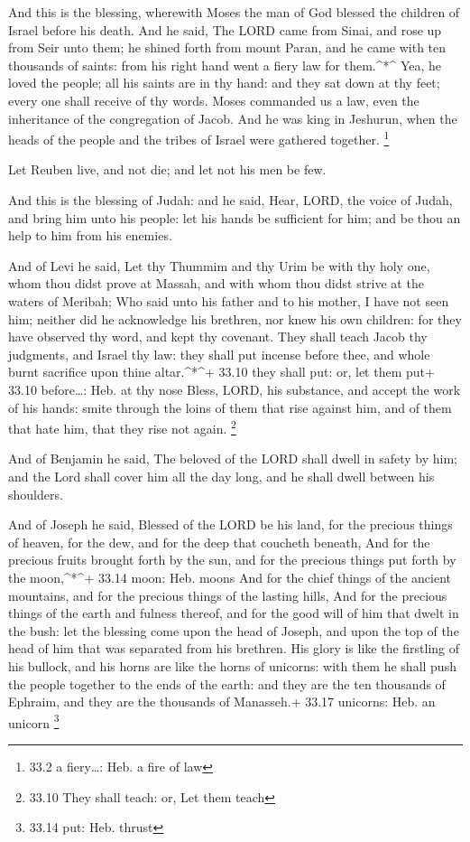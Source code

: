  And this is the blessing, wherewith Moses the man of God
blessed the children of Israel before his death.  And he
said, The LORD came from Sinai, and rose up from Seir unto them; he
shined forth from mount Paran, and he came with ten thousands of saints:
from his right hand went a fiery law for them.\^{}*\^{} 
Yea, he loved the people; all his saints are in thy hand: and they sat
down at thy feet; every one shall receive of thy words. 
Moses commanded us a law, even the inheritance of the congregation of
Jacob.  And he was king in Jeshurun, when the heads of the
people and the tribes of Israel were gathered together. \footnote{33.2 a
  fiery\ldots: Heb. a fire of law}

 Let Reuben live, and not die; and let not his men be few.

 And this is the blessing of Judah: and he said, Hear, LORD,
the voice of Judah, and bring him unto his people: let his hands be
sufficient for him; and be thou an help to him from his enemies.

 And of Levi he said, Let thy Thummim and thy Urim be with
thy holy one, whom thou didst prove at Massah, and with whom thou didst
strive at the waters of Meribah;  Who said unto his father
and to his mother, I have not seen him; neither did he acknowledge his
brethren, nor knew his own children: for they have observed thy word,
and kept thy covenant.  They shall teach Jacob thy
judgments, and Israel thy law: they shall put incense before thee, and
whole burnt sacrifice upon thine altar.\^{}*\^{}+ 33.10 they shall put:
or, let them put+ 33.10 before\ldots: Heb. at thy nose 
Bless, LORD, his substance, and accept the work of his hands: smite
through the loins of them that rise against him, and of them that hate
him, that they rise not again. \footnote{33.10 They shall teach: or, Let
  them teach}

 And of Benjamin he said, The beloved of the LORD shall
dwell in safety by him; and the Lord shall cover him all the day long,
and he shall dwell between his shoulders.

 And of Joseph he said, Blessed of the LORD be his land,
for the precious things of heaven, for the dew, and for the deep that
coucheth beneath,  And for the precious fruits brought
forth by the sun, and for the precious things put forth by the
moon,\^{}*\^{}+ 33.14 moon: Heb. moons  And for the chief
things of the ancient mountains, and for the precious things of the
lasting hills,  And for the precious things of the earth
and fulness thereof, and for the good will of him that dwelt in the
bush: let the blessing come upon the head of Joseph, and upon the top of
the head of him that was separated from his brethren.  His
glory is like the firstling of his bullock, and his horns are like the
horns of unicorns: with them he shall push the people together to the
ends of the earth: and they are the ten thousands of Ephraim, and they
are the thousands of Manasseh.+ 33.17 unicorns: Heb. an unicorn
\footnote{33.14 put: Heb. thrust}

